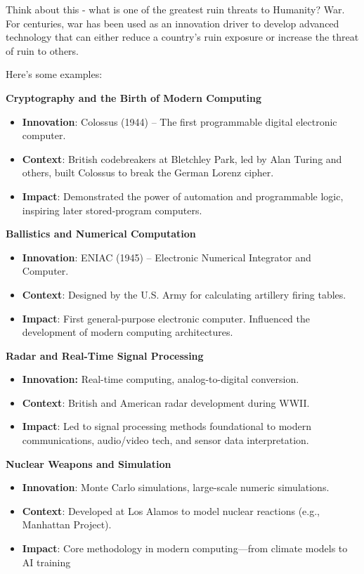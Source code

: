 Think about this - what is one of the greatest ruin threats to Humanity? War. For centuries, war has been used as an innovation driver to develop advanced technology that can either reduce a country's ruin exposure or increase the threat of ruin to others.

Here's some examples:

\textbf{Cryptography and the Birth of Modern Computing}
\begin{itemize}
	\item \textbf{Innovation}: Colossus (1944) – The first programmable digital electronic computer.
	\item \textbf{Context}: British codebreakers at Bletchley Park, led by Alan Turing and others, built Colossus to break the German Lorenz cipher.
	\item \textbf{Impact}: Demonstrated the power of automation and programmable logic, inspiring later stored-program computers. \cite{colossus2006}
\end{itemize}

\textbf{Ballistics and Numerical Computation}
\begin{itemize}
	\item \textbf{Innovation}: ENIAC (1945) – Electronic Numerical Integrator and Computer.
	\item \textbf{Context}: Designed by the U.S. Army for calculating artillery firing tables.
	\item \textbf{Impact}: First general-purpose electronic computer. Influenced the development of modern computing architectures. \cite{montecarlo2014}
\end{itemize}

\textbf{Radar and Real-Time Signal Processing}
\begin{itemize}
	\item \textbf{Innovation:} Real-time computing, analog-to-digital conversion.
	\item \textbf{Context}: British and American radar development during WWII.
	\item \textbf{Impact}: Led to signal processing methods foundational to modern communications, audio/video tech, and sensor data interpretation. \cite{Whirlwind1980}
\end{itemize}

\textbf{Nuclear Weapons and Simulation}
\begin{itemize}
	\item \textbf{Innovation}: Monte Carlo simulations, large-scale numeric simulations.
	\item \textbf{Context}: Developed at Los Alamos to model nuclear reactions (e.g., Manhattan Project).
	\item \textbf{Impact}: Core methodology in modern computing—from climate models to AI training \cite{MonteCarloMethod1949}
\end{itemize}

